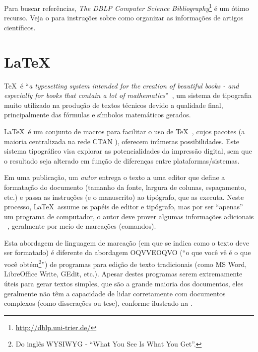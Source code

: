 Para buscar referências, \emph{The DBLP Computer Science Bibliography}\footnote{\url{http://dblp.uni-trier.de/}} é um ótimo recurso. Veja o  
para instruções sobre como organizar as informações de artigos científicos.



\section{\LaTeX}%

\TeX\ é ``\emph{a typesetting system intended for the creation of beautiful books
 - and especially for books that contain a lot of mathematics}''~\cite{Knuth_1986_texbook}, 
 um sistema de tipografia muito utilizado na produção de textos técnicos devido 
 a qualidade final, principalmente das fórmulas e símbolos matemáticos gerados.

\LaTeX\ é um conjunto de macros para facilitar o uso de \TeX~\cite{Lamport_1986_LaTeXDocumentPreparation}, 
cujos pacotes (a maioria centralizada na rede CTAN \cite{greenwade93}), oferecem 
inúmeras possibilidades. Este sistema tipográfico visa explorar as potencialidades 
da impressão digital, sem que o resultado seja alterado em função de diferenças 
entre plataformas/sistemas.

Em uma publicação, um \emph{autor} entrega o texto a uma editor que define a 
formatação do documento (tamanho da fonte, largura de colunas, espaçamento, etc.)
e passa as instruções (e o manuscrito) ao tipógrafo, que as executa. Neste processo,
\LaTeX\ assume os papéis de editor e tipógrafo, mas por ser ``apenas'' um programa 
de computador, o autor deve prover algumas informações adicionais ~\cite{Oetiker_1995_notsoshort},
geralmente por meio de marcações (comandos).

Esta abordagem de linguagem de marcação (em que se indica como o texto deve ser 
formatado) é diferente da abordagem OQVVEOQVO (``o que você vê é o que você 
obtém\footnote{Do inglês WYSIWYG - ``What You See Is What You Get''.}'') de programas 
para edição de texto tradicionais (como MS Word, LibreOffice Write, GEdit, etc.).
Apesar destes programas serem extremamente úteis para gerar textos simples, que 
são a grande maioria dos documentos, eles geralmente não têm a capacidade de lidar 
corretamente com documentos complexos (como disserações ou tese), conforme ilustrado 
na .

